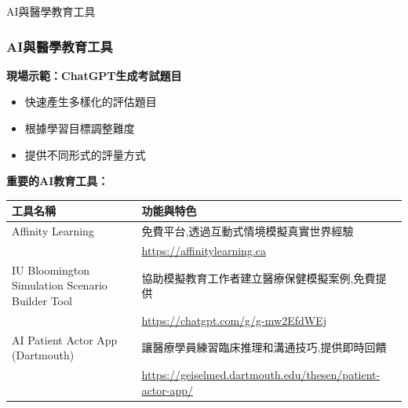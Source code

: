 \documentclass[aspectratio=169]{beamer}
\newcommand{\tablesize}{\fontsize{7.5pt}{9pt}\selectfont}
\begin{document}
\begin{frame}{AI與醫學教育工具}
\frametitle{AI與醫學教育工具}

\textbf{現場示範：ChatGPT生成考試題目}
\begin{itemize}
    \item 快速產生多樣化的評估題目
    \item 根據學習目標調整難度
    \item 提供不同形式的評量方式
\end{itemize}

\vspace{0.5cm}

\textbf{重要的AI教育工具：}

\begin{table}[h]
\centering
\tablesize
\begin{tabular}{p{3.8cm}p{6.8cm}}
\toprule
\textbf{工具名稱} & \textbf{功能與特色} \\
\midrule
Affinity Learning & 免費平台,透過互動式情境模擬真實世界經驗 \\
& \url{https://affinitylearning.ca} \\
\midrule
IU Bloomington Simulation Scenario Builder Tool & 協助模擬教育工作者建立醫療保健模擬案例,免費提供 \\
& \url{https://chatgpt.com/g/g-mw2EfdWEj} \\
\midrule
AI Patient Actor App (Dartmouth) & 讓醫療學員練習臨床推理和溝通技巧,提供即時回饋 \\
& \url{https://geiselmed.dartmouth.edu/thesen/patient-actor-app/} \\
\bottomrule
\end{tabular}
\end{table}
\end{frame}
\end{document}
